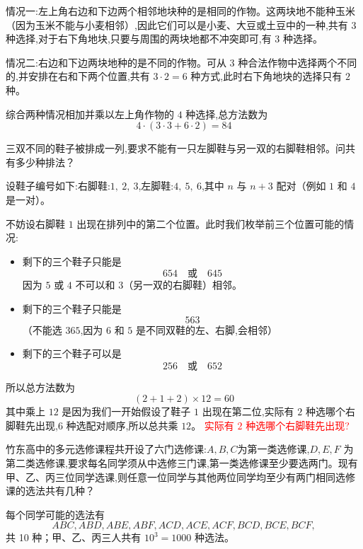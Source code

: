 \begin{questions}
\begin{solution}
        情况一:左上角右边和下边两个相邻地块种的是相同的作物。这两块地不能种玉米（因为玉米不能与小麦相邻）,因此它们可以是小麦、大豆或土豆中的一种,共有 $3$ 种选择,对于右下角地块,只要与周围的两块地都不冲突即可,有 $3$ 种选择。
        
        情况二:右边和下边两块地种的是不同的作物。可从 $3$ 种合法作物中选择两个不同的,并安排在右和下两个位置,共有 $3 \cdot 2 = 6$ 种方式,此时右下角地块的选择只有 $2$ 种。
        
        综合两种情况相加并乘以左上角作物的 $4$ 种选择,总方法数为
        \[
        4 \cdot (3 \cdot 3 + 6 \cdot 2) = 84 
        \]
    \end{solution}
            
\question 三双不同的鞋子被排成一列,要求不能有一只左脚鞋与另一双的右脚鞋相邻。问共有多少种排法？
\begin{solution}
    设鞋子编号如下:右脚鞋:$1,\ 2,\ 3$,左脚鞋:$4,\ 5,\ 6$,其中 $n$ 与 $n+3$ 配对（例如 $1$ 和 $4$ 是一对）。

    不妨设右脚鞋 $1$ 出现在排列中的第二个位置。此时我们枚举前三个位置可能的情况:
    \begin{itemize}
        \item 剩下的三个鞋子只能是
            \[
            654 \quad \text{或} \quad 645
            \]
            因为 $5$ 或 $4$ 不可以和 $3$（另一双的右脚鞋）相邻。
        \item 剩下的三个鞋子只能是
            \[
            563
            \]
            （不能选 $365$,因为 $6$ 和 $5$ 是不同双鞋的左、右脚,会相邻）
        \item 剩下的三个鞋子可以是
            \[
            256 \quad \text{或} \quad 652
            \]
    \end{itemize}
    所以总方法数为
    \[
    (2 + 1 + 2) \times 12 = \boxed{60}
    \]
    其中乘上 $12$ 是因为我们一开始假设了鞋子 $1$ 出现在第二位,实际有 $2$ 种选哪个右脚鞋先出现,$6$ 种选配对顺序,所以总共乘 $12$。
    \textcolor{red}{实际有 $2$ 种选哪个右脚鞋先出现?}
\end{solution}

    \question 竹东高中的多元选修课程共开设了六门选修课:$A,B,C $为第一类选修课,$D,E,F$ 为第二类选修课,要求每名同学须从中选修三门课,第一类选修课至少要选两门。现有甲、乙、丙三位同学选课,则任意一位同学与其他两位同学均至少有两门相同选修课的选法共有几种？
    \begin{solution}
        每个同学可能的选法有$$ABC, ABD, ABE, ABF, ACD, ACE, ACF, BCD, BCE, BCF,$$共 10 种；甲、乙、丙三人共有 $10^3=1000$ 种选法。


\end{solution}
\end{questions}
